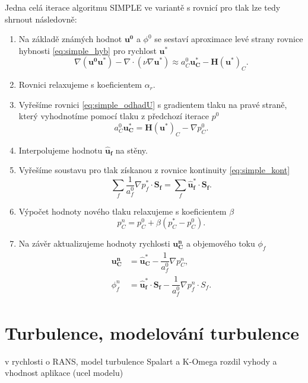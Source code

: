 Jedna celá iterace algoritmu SIMPLE ve variantě s rovnicí pro tlak lze tedy shrnout následovně:
\begin{enumerate}
	\item Na základě známých hodnot $ \mathbf{u^0} $ a $ \phi^0 $ se sestaví aproximace levé strany rovnice hybnosti \ref{eq:simple_hyb} pro rychlost $ \mathbf{u^*} $
	\begin{equation}\label{key}
	\nabla(\mathbf{u^0}\mathbf{u^*}) - \nabla\cdot(\nu\nabla\mathbf{u^*}) \approx a_C^0 \mathbf{u_C^*} - \mathbf{H}(\mathbf{u^*})_C.
	\end{equation}
	\item Rovnici relaxujeme s koeficientem $ \alpha_r $.
	\item Vyřešíme rovnici \ref{eq:simple_odhadU} s gradientem tlaku na pravé straně, který vyhodnotíme pomocí tlaku z předchozí iterace $ p^0 $
	\begin{equation}\label{key}
	a_C^0\mathbf{u_C^*}
	=
	\mathbf{H}(\mathbf{u^*})_C
	-\nabla p_C^0.
	\end{equation}
	\item Interpolujeme hodnotu $ \mathbf{\widehat{u}_f} $ na stěny.
	\item Vyřešíme soustavu pro tlak získanou z rovnice kontinuity \ref{eq:simple_kont}
	\begin{equation}\label{key}
	\sum_f\dfrac{1}{a_f^0}\nabla p_f^*\cdot \mathbf{S_f}
	=\sum_f \mathbf{\widehat{u}^*_f}\cdot \mathbf{S_f}.
	\end{equation}
	\item Výpočet hodnoty nového tlaku relaxujeme s koeficientem $ \beta $
	\begin{equation}\label{key}
	p_C^n=p_C^0 + \beta (p_C^*-p_C^0).
	\end{equation}
	\item Na závěr aktualizujeme hodnoty rychlosti $ \mathbf{u^n_C} $ a objemového toku $ \phi_f $
	\begin{align}
	\mathbf{u_C^n}&=\mathbf{\widehat{u}^*_C}-\dfrac{1}{a_f^0}\nabla p_C^n, \\
	\phi_f^n&=\mathbf{\widehat{u}^*_f}\cdot \mathbf{S_f}-\dfrac{1}{a_f^0}\nabla p_f^n\cdot S_f.
	\end{align}
\end{enumerate}

\section{Turbulence, modelování turbulence}
v rychlosti o RANS, model turbulence Spalart a K-Omega rozdil vyhody a vhodnost aplikace (ucel modelu)

